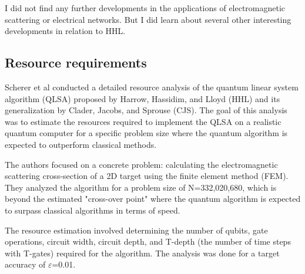 \documentclass[12pt]{extarticle}
\begin{document}
I did not find any further developments in the applications of electromagnetic scattering or electrical networks.
But I did learn about several other interesting developments in relation to HHL.


\subsection{Resource requirements}


Scherer et al\cite{scherer2017concrete} conducted a detailed resource analysis of the quantum linear system algorithm (QLSA) proposed by Harrow, Hassidim, and Lloyd (HHL) and its generalization by Clader, Jacobs, and Sprouse (CJS).
The goal of this analysis was to estimate the resources required to implement the QLSA on a realistic quantum computer for a specific problem size where the quantum algorithm is expected to outperform classical methods.

The authors focused on a concrete problem: calculating the electromagnetic scattering cross-section of a 2D target using the finite element method (FEM). They analyzed the algorithm for a problem size of N=332,020,680, which is beyond the estimated "cross-over point" where the quantum algorithm is expected to surpass classical algorithms in terms of speed.

The resource estimation involved determining the number of qubits, gate operations, circuit width, circuit depth, and T-depth
(the number of time steps with T-gates) required for the algorithm. The analysis was done for a target accuracy of $\varepsilon$=0.01.
\end{document}
